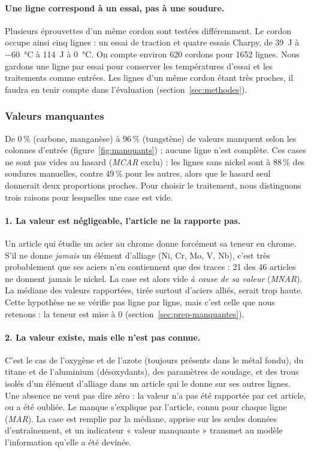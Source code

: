 \paragraph{Une ligne correspond à un essai, pas à une soudure.} Plusieurs éprouvettes
d'un même cordon sont testées différemment. Le cordon  occupe
ainsi cinq lignes : un essai de traction et quatre essais Charpy, de \SI{39}{\joule} à
\SI{-60}{\celsius} à \SI{114}{\joule} à \SI{0}{\celsius}. On compte environ 620 cordons
pour 1652 lignes. Nous gardons une ligne par essai pour conserver les températures d'essai
et les traitements comme entrées. Les lignes d'un même cordon étant très proches, il
faudra en tenir compte dans l'évaluation (section~\ref{sec:methodes}).


\subsubsection{Valeurs manquantes}

De 0\,\% (carbone, manganèse) à 96\,\% (tungstène) de valeurs manquent selon les
colonnes d'entrée (figure~\ref{fig:manquants}) ; aucune ligne n'est complète. Ces cases
ne sont pas vides au hasard (\emph{MCAR} exclu) : les lignes sans nickel sont à 88\,\% des
soudures manuelles, contre 49\,\% pour les autres, alors que le hasard seul donnerait deux
proportions proches. Pour choisir le traitement, nous distinguons trois raisons pour
lesquelles une case est vide.

\paragraph{1. La valeur est négligeable, l'article ne la rapporte pas.} Un article qui
étudie un acier au chrome donne forcément sa teneur en chrome. S'il ne donne \emph{jamais}
un élément d'alliage (Ni, Cr, Mo, V, Nb), c'est très probablement que ses aciers n'en
contiennent que des traces : 21 des 46 articles ne donnent jamais le nickel. La case est
alors vide \emph{à cause de sa valeur} (\emph{MNAR}). La médiane des valeurs rapportées,
tirée surtout d'aciers alliés, serait trop haute. Cette hypothèse ne se vérifie pas ligne
par ligne, mais c'est celle que nous retenons : la teneur est mise à 0
(section~\ref{sec:prep-manquantes}).

\paragraph{2. La valeur existe, mais elle n'est pas connue.} C'est le cas de l'oxygène et
de l'azote (toujours présents dans le métal fondu), du titane et de l'aluminium
(désoxydants), des paramètres de soudage, et des trous isolés d'un élément d'alliage dans
un article qui le donne sur ses autres lignes. Une absence ne veut pas dire zéro : la
valeur n'a pas été rapportée par cet article, ou a été oubliée. Le manque s'explique par
l'article, connu pour chaque ligne (\emph{MAR}). La case est remplie par la médiane,
apprise sur les seules données d'entraînement, et un indicateur « valeur manquante »
transmet au modèle l'information qu'elle a été devinée.

